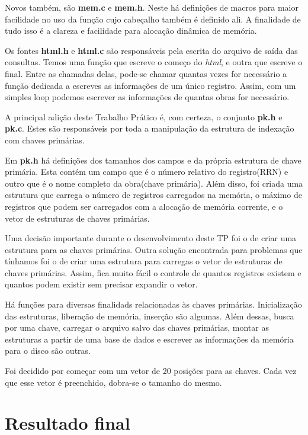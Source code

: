 \documentclass{article}
\begin{document}
Novos também, são \textbf{mem.c} e \textbf{mem.h}. Neste há definições de macros para maior facilidade no uso da função cujo cabeçalho também é definido ali. A finalidade de tudo isso é a clareza e facilidade para alocação dinâmica de memória.

Os fontes \textbf{html.h} e \textbf{html.c} são responsáveis pela escrita do arquivo de saída das consultas. Temos uma função que escreve o começo do \textit{html}, e outra que escreve o final. Entre as chamadas delas, pode-se chamar quantas vezes for necessário a função dedicada a escreves as informações de um único registro. Assim, com um simples loop podemos escrever as informações de quantas obras for necessário.

A principal adição deste Trabalho Prático é, com certeza, o conjunto \textbf{pk.h} e \textbf{pk.c}. Estes são responsáveis por toda a manipulação da estrutura de indexação com chaves primárias.

Em \textbf{pk.h} há definições dos tamanhos dos campos e da própria estrutura de chave primária. Esta contém um campo que é o número relativo do registro(RRN) e outro que é o nome completo da obra(chave primária). Além disso, foi criada uma estrutura que carrega o número de registros carregados na memória, o máximo de registros que podem ser carregados com a alocação de memória corrente, e o vetor de estruturas de chaves primárias. 

Uma decisão importante durante o desenvolvimento deste TP foi o de criar uma estrutura para as chaves primárias. Outra solução encontrada para problemas que tínhamos foi o de criar uma estrutura para carregas o vetor de estruturas de chaves primárias. Assim, fica muito fácil o controle de quantos registros existem e quantos podem existir sem precisar expandir o vetor.

Há funções para diversas finalidads relacionadas às chaves primárias. Inicialização das estruturas, liberação de memória, inserção são algumas. Além dessas, busca por uma chave, carregar o arquivo salvo das chaves primárias, montar as estruturas a partir de uma base de dados e escrever as informações da memória para o disco são outras.

Foi decidido por começar com um vetor de 20 posições para as chaves. Cada vez que esse vetor é preenchido, dobra-se o tamanho do mesmo.

\section{Resultado final}\
\end{document}
